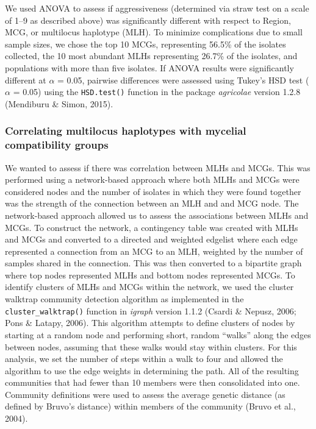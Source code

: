 We used ANOVA to assess if aggressiveness (determined via straw test on
a scale of 1--9 as described above) was significantly different with
respect to Region, MCG, or multilocus haplotype (MLH). To minimize
complications due to small sample sizes, we chose the top 10 MCGs,
representing 56.5\% of the isolates collected, the 10 most abundant MLHs
representing 26.7\% of the isolates, and populations with more than five
isolates. If ANOVA results were significantly different at \(\alpha\) =
0.05, pairwise differences were assessed using Tukey's HSD test
(\(\alpha\) = 0.05) using the \texttt{HSD.test()} function in the
package \emph{agricolae} version 1.2.8 (Mendiburu \& Simon, 2015).

\subsubsection*{Correlating multilocus haplotypes with mycelial
compatibility
groups}\label{correlating-multilocus-haplotypes-with-mycelial-compatibility-groups}

We wanted to assess if there was correlation between MLHs and MCGs. This
was performed using a network-based approach where both MLHs and MCGs
were considered nodes and the number of isolates in which they were
found together was the strength of the connection between an MLH and and
MCG node. The network-based approach allowed us to assess the
associations between MLHs and MCGs. To construct the network, a
contingency table was created with MLHs and MCGs and converted to a
directed and weighted edgelist where each edge represented a connection
from an MCG to an MLH, weighted by the number of samples shared in the
connection. This was then converted to a bipartite graph where top nodes
represented MLHs and bottom nodes represented MCGs. To identify clusters
of MLHs and MCGs within the network, we used the cluster walktrap
community detection algorithm as implemented in the
\texttt{cluster\_walktrap()} function in \emph{igraph} version 1.1.2
(Csardi \& Nepusz, 2006; Pons \& Latapy, 2006). This algorithm attempts
to define clusters of nodes by starting at a random node and performing
short, random ``walks'' along the edges between nodes, assuming that
these walks would stay within clusters. For this analysis, we set the
number of steps within a walk to four and allowed the algorithm to use
the edge weights in determining the path. All of the resulting
communities that had fewer than 10 members were then consolidated into
one. Community definitions were used to assess the average genetic
distance (as defined by Bruvo's distance) within members of the
community (Bruvo et al., 2004).

